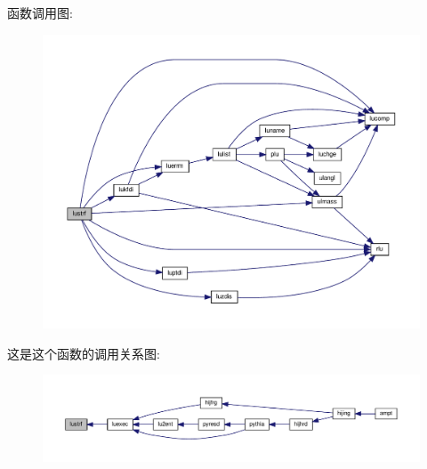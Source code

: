 函数调用图\+:
\nopagebreak
\begin{figure}[H]
\begin{center}
\leavevmode
\includegraphics[width=350pt]{lustrf_8f90_a5ef92fc62d057e720becaf39df720e09_cgraph}
\end{center}
\end{figure}
这是这个函数的调用关系图\+:
\nopagebreak
\begin{figure}[H]
\begin{center}
\leavevmode
\includegraphics[width=350pt]{lustrf_8f90_a5ef92fc62d057e720becaf39df720e09_icgraph}
\end{center}
\end{figure}
